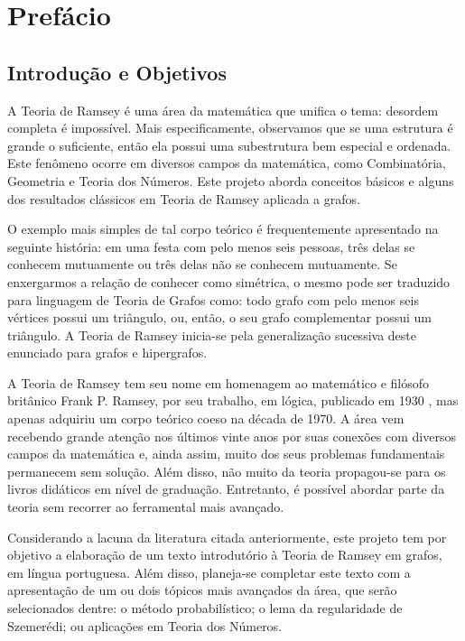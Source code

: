 
\chapter{Prefácio}

\section*{Introdução e Objetivos}

A Teoria de Ramsey é uma área da matemática que unifica o tema: desordem completa é impossível. Mais especificamente, observamos que se uma estrutura é grande o suficiente, então ela possui uma subestrutura bem especial e ordenada. Este fenômeno ocorre em diversos campos da matemática, como Combinatória, Geometria e Teoria dos Números. Este projeto aborda conceitos básicos e alguns dos resultados clássicos em Teoria de Ramsey aplicada a grafos.

O exemplo mais simples de tal corpo teórico é frequentemente apresentado na seguinte história: em uma festa com pelo menos seis pessoas, três delas se conhecem mutuamente ou três delas não se conhecem mutuamente. Se enxergarmos a relação de conhecer como simétrica, o mesmo pode ser traduzido para linguagem de Teoria de Grafos como: todo grafo com pelo menos seis vértices possui um triângulo, ou, então, o seu grafo complementar possui um triângulo. A Teoria de Ramsey inicia-se pela generalização sucessiva deste enunciado para grafos e hipergrafos.

A Teoria de Ramsey tem seu nome em homenagem ao matemático e filósofo britânico Frank P. Ramsey, por seu trabalho, em lógica, publicado em 1930 \cite{ramsey}, mas apenas adquiriu um corpo teórico coeso na década de 1970. A área vem recebendo grande atenção nos últimos vinte anos por suas conexões com diversos campos da matemática e, ainda assim, muito dos seus problemas fundamentais permanecem sem solução. Além disso, não muito da teoria propagou-se para os livros didáticos em nível de graduação. Entretanto, é possível abordar parte da teoria sem recorrer ao ferramental mais avançado.

Considerando a lacuna da literatura citada anteriormente, este projeto tem por objetivo a elaboração de um texto introdutório à Teoria de Ramsey em grafos, em língua portuguesa. Além disso, planeja-se completar este texto com a apresentação de um ou dois tópicos mais avançados da área, que serão selecionados dentre: o método probabilístico; o lema da regularidade de Szemerédi; ou aplicações em Teoria dos Números.

